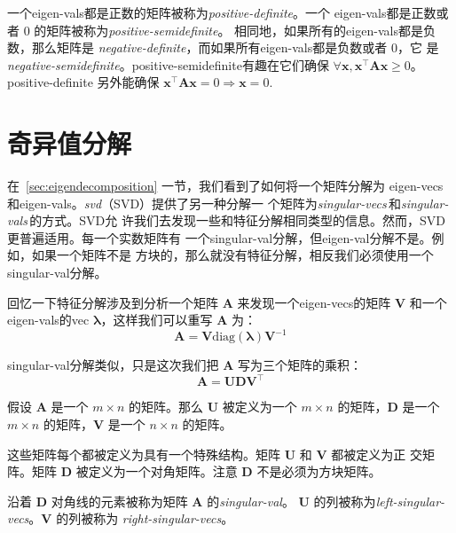 一个\gls*{eigen-vals}都是正数的矩阵被称为\emph{\gls{positive-definite}}。一个
\gls*{eigen-vals}都是正数或者 $0$ 的矩阵被称为\emph{\gls{positive-semidefinite}}。
相同地，如果所有的\gls*{eigen-vals}都是负数，那么矩阵是
\emph{\gls{negative-definite}}，而如果所有\gls*{eigen-vals}都是负数或者 $0$，它
是\emph{\gls{negative-semidefinite}}。\gls*{positive-semidefinite}有趣在它们确保
$\forall\pmb{x}, \pmb{x}^{\top}\pmb{A}\pmb{x} \geq 0$。\gls*{positive-definite}
另外能确保 $\pmb{x}^{\top}\pmb{A}\pmb{x} = 0 \Rightarrow \pmb{x} = 0$.

\section{奇异值分解}
\label{sec:singular_value_decomposition}

在~\ref{sec:eigendecomposition} 一节，我们看到了如何将一个矩阵分解为
\gls*{eigen-vecs} 和\gls*{eigen-vals}。\emph{\gls{svd}}（SVD）提供了另一种分解一
个矩阵为\emph{\gls{singular-vecs}}\,和\emph{\gls{singular-vals}}\,的方式。SVD允
许我们去发现一些和特征分解相同类型的信息。然而，SVD 更普遍适用。每一个实数矩阵有
一个\gls*{singular-val}分解，但\gls*{eigen-val}分解不是。例如，如果一个矩阵不是
方块的，那么就没有特征分解，相反我们必须使用一个\gls*{singular-val}分解。

回忆一下特征分解涉及到分析一个矩阵 $\pmb{A}$ 来发现一个\gls*{eigen-vecs}的矩阵
$\pmb{V}$ 和一个\gls*{eigen-vals}的\gls*{vec} $\pmb{\lambda}$，这样我们可以重写
$\pmb{A}$ 为：
\begin{equation}
  \pmb{A} = \pmb{V}\mathrm{diag}(\pmb{\lambda})\pmb{V}^{-1}
\end{equation}

\gls*{singular-val}分解类似，只是这次我们把 $\pmb{A}$ 写为三个矩阵的乘积：
\begin{equation}
  \pmb{A} = \pmb{U}\pmb{D}\pmb{V}^{\top}
\end{equation}

假设 $\pmb{A}$ 是一个 $m \times n$ 的矩阵。那么 $\pmb{U}$ 被定义为一个 $m \times
n$ 的矩阵，$\pmb{D}$ 是一个 $m \times n$ 的矩阵，$\pmb{V}$ 是一个 $n \times n$
的矩阵。

这些矩阵每个都被定义为具有一个特殊结构。矩阵 $\pmb{U}$ 和 $\pmb{V}$ 都被定义为正
交矩阵。矩阵 $\pmb{D}$ 被定义为一个对角矩阵。注意 $\pmb{D}$ 不是必须为方块矩阵。

沿着 $\pmb{D}$ 对角线的元素被称为矩阵 $\pmb{A}$ 的\emph{\gls{singular-val}}。
$\pmb{U}$ 的列被称为\emph{\gls{left-singular-vecs}}。$\pmb{V}$ 的列被称为
\emph{\gls{right-singular-vecs}}。


